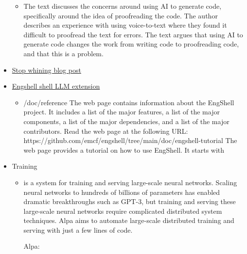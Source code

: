 \begin{itemize}
  \begin{itemize}
  
  \item
    The text discusses the concerns around using AI to generate code,
    specifically around the idea of proofreading the code. The author
    describes an experience with using voice-to-text where they found it
    difficult to proofread the text for errors. The text argues that
    using AI to generate code changes the work from writing code to
    proofreading code, and that this is a problem.
  \end{itemize}
\item
  \href{https://about.sourcegraph.com/blog/cheating-is-all-you-need}{Stop
  whining blog post}
\item
  \href{https://github.com/emcf/engshell/tree/main}{Engshell shell LLM
  extension}

  \begin{itemize}
  
  \item
    /doc/reference The web page contains information about the EngShell
    project. It includes a list of the major features, a list of the
    major components, a list of the major dependencies, and a list of
    the major contributors. Read the web page at the following URL:
    https://github.com/emcf/engshell/tree/main/doc/engshell-tutorial The
    web page provides a tutorial on how to use EngShell. It starts with
  \end{itemize}
\item
  Training

  \begin{itemize}
  \item
    \href{https://github.com/alpa-projects/alpa}{}

    is a system for training and serving large-scale neural networks.
    Scaling neural networks to hundreds of billions of parameters has
    enabled dramatic breakthroughs such as GPT-3, but training and
    serving these large-scale neural networks require complicated
    distributed system techniques. Alpa aims to automate large-scale
    distributed training and serving with just a few lines of code.

    Alpa:


\end{itemize}
\end{itemize}
